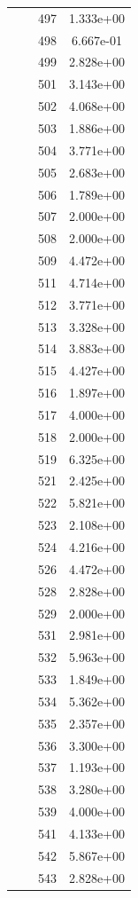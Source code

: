 \documentclass[12pt]{article}
\begin{document}
\begin{longtable}{@{}cccc@{}}
 &  & 497 & 1.333e+00 \\
 &  & 498 & 6.667e-01 \\
 &  & 499 & 2.828e+00 \\
 &  & 501 & 3.143e+00 \\
 &  & 502 & 4.068e+00 \\
 &  & 503 & 1.886e+00 \\
 &  & 504 & 3.771e+00 \\
 &  & 505 & 2.683e+00 \\
 &  & 506 & 1.789e+00 \\
 &  & 507 & 2.000e+00 \\
 &  & 508 & 2.000e+00 \\
 &  & 509 & 4.472e+00 \\
 &  & 511 & 4.714e+00 \\
 &  & 512 & 3.771e+00 \\
 &  & 513 & 3.328e+00 \\
 &  & 514 & 3.883e+00 \\
 &  & 515 & 4.427e+00 \\
 &  & 516 & 1.897e+00 \\
 &  & 517 & 4.000e+00 \\
 &  & 518 & 2.000e+00 \\
 &  & 519 & 6.325e+00 \\
 &  & 521 & 2.425e+00 \\
 &  & 522 & 5.821e+00 \\
 &  & 523 & 2.108e+00 \\
 &  & 524 & 4.216e+00 \\
 &  & 526 & 4.472e+00 \\
 &  & 528 & 2.828e+00 \\
 &  & 529 & 2.000e+00 \\
 &  & 531 & 2.981e+00 \\
 &  & 532 & 5.963e+00 \\
 &  & 533 & 1.849e+00 \\
 &  & 534 & 5.362e+00 \\
 &  & 535 & 2.357e+00 \\
 &  & 536 & 3.300e+00 \\
 &  & 537 & 1.193e+00 \\
 &  & 538 & 3.280e+00 \\
 &  & 539 & 4.000e+00 \\
 &  & 541 & 4.133e+00 \\
 &  & 542 & 5.867e+00 \\
 &  & 543 & 2.828e+00 \\

\end{longtable}
\end{document}
